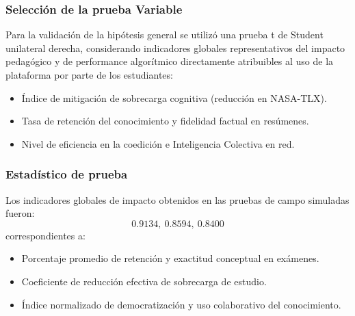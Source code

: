 \subsubsection{Selección de la prueba Variable}
Para la validación de la hipótesis general se utilizó una prueba t de Student unilateral derecha, considerando indicadores globales representativos del impacto pedagógico y de performance algorítmico directamente atribuibles al uso de la plataforma por parte de los estudiantes:
\begin{itemize}
    \item Índice de mitigación de sobrecarga cognitiva (reducción en NASA-TLX).
    \item Tasa de retención del conocimiento y fidelidad factual en resúmenes.
    \item Nivel de eficiencia en la coedición e Inteligencia Colectiva en red.
\end{itemize}

\vspace{0.4cm}

\subsubsection{Estadístico de prueba}
Los indicadores globales de impacto obtenidos en las pruebas de campo simuladas fueron:
\[
0.9134,\ 0.8594,\ 0.8400
\]
correspondientes a:
\begin{itemize}
    \item Porcentaje promedio de retención y exactitud conceptual en exámenes.
    \item Coeficiente de reducción efectiva de sobrecarga de estudio.
    \item Índice normalizado de democratización y uso colaborativo del conocimiento.
\end{itemize}

\vspace{0.4cm}

